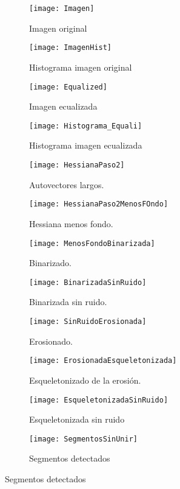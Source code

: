 \begin{figure}

	\begin{subfigure}[c]{.33\linewidth}
	\centering\large \texttt{[image: Imagen]}
	\caption{Imagen original}\label{fig:2.1.1}
	\end{subfigure}%
	\begin{subfigure}[c]{.33\linewidth}
	\centering\large \texttt{[image: ImagenHist]}
	\caption{Histograma imagen original}\label{fig:2.1.2}
	\end{subfigure}%
	\begin{subfigure}[c]{.33\linewidth}
	\centering\large \texttt{[image: Equalized]}
	\caption{Imagen ecualizada}\label{fig:2.1.3}
	\end{subfigure}%
	
	\begin{subfigure}[c]{.33\linewidth}
	\centering\large \texttt{[image: Histograma\_Equali]}
	\caption{Histograma imagen ecualizada}\label{fig:2.1.4}
	\end{subfigure}%
	\begin{subfigure}[c]{.33\linewidth}
	\centering\large \texttt{[image: HessianaPaso2]}
	\caption{Autovectores largos.}\label{fig:2.1.5}
	\end{subfigure}%
	\begin{subfigure}[c]{.33\linewidth}
	\centering\large \texttt{[image: HessianaPaso2MenosFOndo]}
	\caption{Hessiana menos fondo.}\label{fig:2.1.6}
	\end{subfigure}%

	\begin{subfigure}[c]{.33\linewidth}
	\centering\large \texttt{[image: MenosFondoBinarizada]}
	\caption{Binarizado.}\label{fig:2.1.7}
	\end{subfigure}%
	\begin{subfigure}[c]{.33\linewidth}
	\centering\large \texttt{[image: BinarizadaSinRuido]}
	\caption{Binarizada sin ruido.}\label{fig:2.1.8}
	\end{subfigure}%
	\begin{subfigure}[c]{.33\linewidth}
	\centering\large \texttt{[image: SinRuidoErosionada]}
	\caption{Erosionado.}\label{fig:2.1.9}
	\end{subfigure}%
	
	\begin{subfigure}[c]{.33\linewidth}
	\centering\large \texttt{[image: ErosionadaEsqueletonizada]}
	\caption{Esqueletonizado de la erosión.}\label{fig:2.1.10}
	\end{subfigure}%
	\begin{subfigure}{.33\linewidth}
	\centering\large \texttt{[image: EsqueletonizadaSinRuido]}
	\caption{Esqueletonizada sin ruido}\label{fig:2.1.11}
	\end{subfigure}%
	\begin{subfigure}{.33\linewidth}
	\centering\large \texttt{[image: SegmentosSinUnir]}
	\caption{Segmentos detectados}\label{fig:2.1.12}
	\end{subfigure}%
	

\end{figure}
